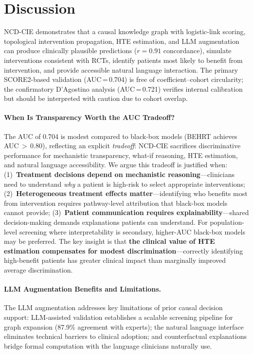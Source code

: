 \documentclass[runningheads]{llncs}
\begin{document}
\section{Discussion}\label{sec:discussion}

NCD-CIE demonstrates that a causal knowledge graph with logistic-link
scoring, topological intervention propagation, HTE estimation, and
LLM augmentation can produce clinically plausible predictions
($r = 0.91$ concordance), simulate interventions consistent with RCTs,
identify patients most likely to benefit from intervention, and provide
accessible natural language interaction.
The primary SCORE2-based validation (AUC\,=\,0.704) is free of
coefficient--cohort circularity; the confirmatory D'Agostino analysis
(AUC\,=\,0.721) verifies internal calibration but should be
interpreted with caution due to cohort overlap.

\paragraph{When Is Transparency Worth the AUC Tradeoff?}
The AUC of 0.704 is modest compared to black-box models
(BEHRT achieves AUC\,$>$\,0.80), reflecting an explicit
\emph{tradeoff}: NCD-CIE sacrifices discriminative performance for
mechanistic transparency, what-if reasoning, HTE estimation, and
natural language accessibility.
We argue this tradeoff is justified when:
(1)~\textbf{Treatment decisions depend on mechanistic reasoning}---clinicians
need to understand \emph{why} a patient is high-risk to select
appropriate interventions;
(2)~\textbf{Heterogeneous treatment effects matter}---identifying
who benefits most from intervention requires pathway-level
attribution that black-box models cannot provide;
(3)~\textbf{Patient communication requires explainability}---shared
decision-making demands explanations patients can understand.
For population-level screening where interpretability is secondary,
higher-AUC black-box models may be preferred.
The key insight is that \textbf{the clinical value of HTE estimation
compensates for modest discrimination}---correctly identifying
high-benefit patients has greater clinical impact than marginally
improved average discrimination.

\paragraph{LLM Augmentation Benefits and Limitations.}
The LLM augmentation addresses key limitations of prior causal
decision support: LLM-assisted validation establishes a scalable
screening pipeline for graph expansion (87.9\% agreement with experts);
the natural language interface eliminates technical barriers to
clinical adoption; and counterfactual explanations bridge formal
computation with the language clinicians naturally use.
\end{document}
